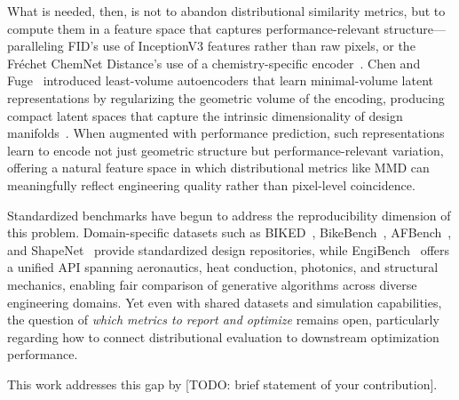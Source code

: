 What is needed, then, is not to abandon distributional similarity metrics, but to compute them in a feature space that captures performance-relevant structure---paralleling FID's use of InceptionV3 features rather than raw pixels, or the Fr\'{e}chet ChemNet Distance's use of a chemistry-specific encoder~\cite{preuer2018frechet}.
Chen and Fuge~\cite{chen2024compressing} introduced least-volume autoencoders that learn minimal-volume latent representations by regularizing the geometric volume of the encoding, producing compact latent spaces that capture the intrinsic dimensionality of design manifolds~\cite{chen2024isometric}.
When augmented with performance prediction, such representations learn to encode not just geometric structure but performance-relevant variation, offering a natural feature space in which distributional metrics like MMD can meaningfully reflect engineering quality rather than pixel-level coincidence.

Standardized benchmarks have begun to address the reproducibility dimension of this problem.
Domain-specific datasets such as BIKED~\cite{regenwetter2021biked}, BikeBench~\cite{regenwetter2025bikebench}, AFBench~\cite{liu2024afbench}, and ShapeNet~\cite{chang2015shapenet} provide standardized design repositories, while EngiBench~\cite{engibench2025} offers a unified API spanning aeronautics, heat conduction, photonics, and structural mechanics, enabling fair comparison of generative algorithms across diverse engineering domains.
Yet even with shared datasets and simulation capabilities, the question of \emph{which metrics to report and optimize} remains open, particularly regarding how to connect distributional evaluation to downstream optimization performance.

This work addresses this gap by [TODO: brief statement of your contribution].
